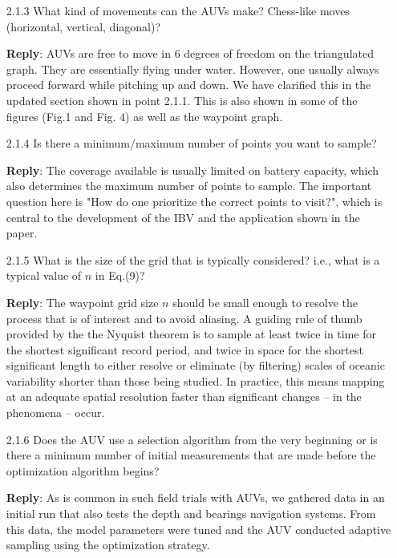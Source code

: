 \documentclass[a4paper]{article}
\def\reply{\textbf{Reply}}
\begin{document}
\begin{answers}
\begin{itemize}[noitemsep,topsep=0pt,parsep=0pt,partopsep=0pt]
\item[2.1.3] What kind of movements can the AUVs make? Chess-like moves (horizontal, vertical, diagonal)?\par  

\reply: AUVs are free to move in 6 degrees of freedom on the triangulated graph. They are essentially flying under water. However, one usually always proceed forward while pitching up and down. We have clarified this in the updated section shown in point 2.1.1. This is also shown in some of the figures (Fig.1 and Fig. 4) as well as the waypoint graph. 
\vspace{1em}

\item[2.1.4] Is there a minimum/maximum number of points you want to sample?\par

\reply: The coverage available is usually limited on battery capacity, which also determines the maximum number of points to sample. The important question here is "How do one prioritize the correct points to visit?", which is central to the development of the IBV and the application shown in the paper. 
\vspace{1em}

\item[2.1.5] What is the size of the grid that is typically considered? i.e., what is a typical value of $n$ in Eq.(9)?\par 

\reply: The waypoint grid size $n$ should be small enough to resolve the process that is of interest and to avoid aliasing. A guiding rule of thumb provided by the the Nyquist theorem is to sample at least twice in time for the shortest significant record period, and twice in space for the shortest significant length to either resolve or eliminate (by filtering) scales of oceanic variability shorter than those being studied. In practice, this means mapping at an adequate spatial resolution faster than significant changes – in the phenomena – occur. 
\vspace{1em}

\item[2.1.6] Does the AUV use a selection algorithm from the very beginning or is there a minimum number of initial measurements that are made before the optimization algorithm begins?\par

\reply: As is common in such field trials with AUVs, we gathered data in an initial run that also tests the depth and bearings navigation systems. From this data, the model parameters were tuned and the AUV conducted adaptive sampling using the optimization strategy.
\vspace{1em}


\end{itemize}
\end{answers}
\end{document}
